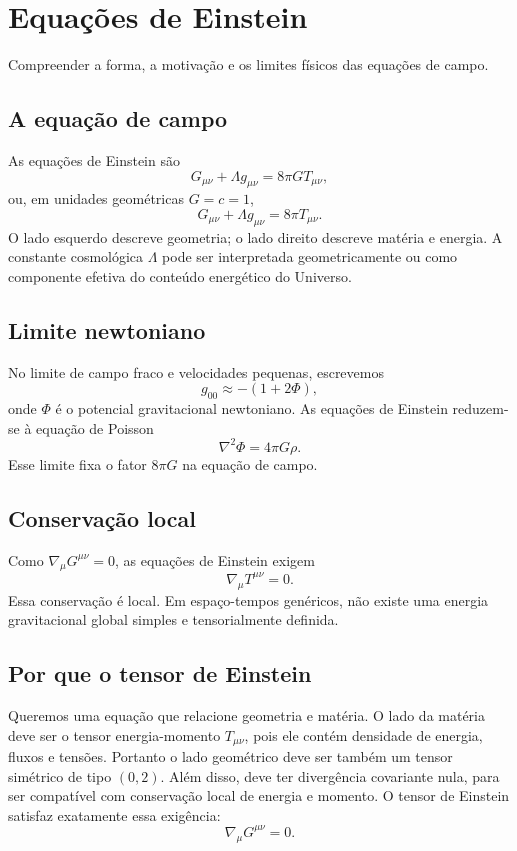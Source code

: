\documentclass[12pt,a4paper,oneside]{book}
\theoremstyle{rgplain}
\theoremstyle{rgremark}
\begin{document}
\chapter{Equações de Einstein}
\label{cap:einstein}

\begin{objetivos}
Compreender a forma, a motivação e os limites físicos das equações de campo.
\end{objetivos}

\section{A equação de campo}

As equações de Einstein são
\[
  G_{\mu\nu}+\Lambda g_{\mu\nu}=8\pi G T_{\mu\nu},
\]
ou, em unidades geométricas $G=c=1$,
\[
  G_{\mu\nu}+\Lambda g_{\mu\nu}=8\pi T_{\mu\nu}.
\]
O lado esquerdo descreve geometria; o lado direito descreve matéria e energia.
A constante cosmológica $\Lambda$ pode ser interpretada geometricamente ou como
componente efetiva do conteúdo energético do Universo.

\section{Limite newtoniano}

No limite de campo fraco e velocidades pequenas, escrevemos
\[
  g_{00}\approx -(1+2\Phi),
\]
onde $\Phi$ é o potencial gravitacional newtoniano. As equações de Einstein
reduzem-se à equação de Poisson
\[
  \nabla^2\Phi=4\pi G\rho.
\]
Esse limite fixa o fator $8\pi G$ na equação de campo.

\section{Conservação local}
\label{sec:conservacao-local}

Como $\nabla_\mu G^{\mu\nu}=0$, as equações de Einstein exigem
\[
  \nabla_\mu T^{\mu\nu}=0.
\]
Essa conservação é local. Em espaço-tempos genéricos, não existe uma energia
gravitacional global simples e tensorialmente definida.

\section{Por que o tensor de Einstein}

Queremos uma equação que relacione geometria e matéria. O lado da matéria deve
ser o tensor energia-momento $T_{\mu\nu}$, pois ele contém densidade de energia,
fluxos e tensões. Portanto o lado geométrico deve ser também um tensor
simétrico de tipo $(0,2)$. Além disso, deve ter divergência covariante nula,
para ser compatível com conservação local de energia e momento. O tensor de
Einstein satisfaz exatamente essa exigência:
\[
  \nabla_\mu G^{\mu\nu}=0.
\]
\end{document}
